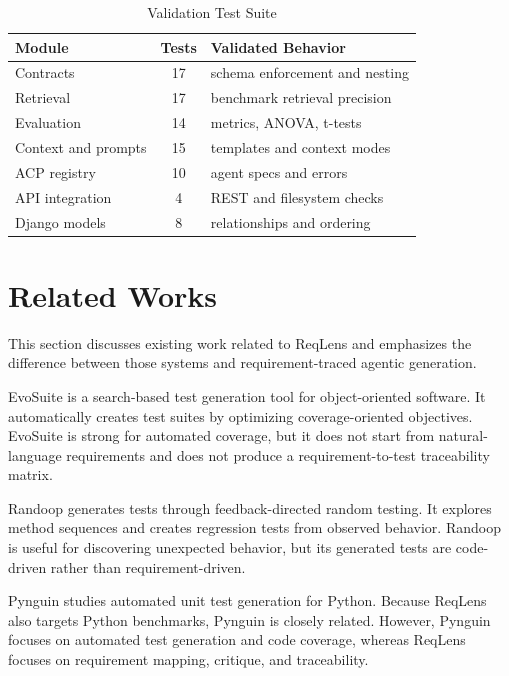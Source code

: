 \documentclass[conference]{IEEEtran}
\begin{document}
\begin{table}[htbp]
\caption{Validation Test Suite}
\begin{center}
\begin{tabular}{|p{}|c|p{}|}
\hline
\textbf{Module} & \textbf{Tests} & \textbf{Validated Behavior} \\
\hline
Contracts & 17 & schema enforcement and nesting \\
\hline
Retrieval & 17 & benchmark retrieval precision \\
\hline
Evaluation & 14 & metrics, ANOVA, t-tests \\
\hline
Context and prompts & 15 & templates and context modes \\
\hline
ACP registry & 10 & agent specs and errors \\
\hline
API integration & 4 & REST and filesystem checks \\
\hline
Django models & 8 & relationships and ordering \\
\hline
\end{tabular}
\label{tab:tests}
\end{center}
\end{table}

\section{Related Works}
This section discusses existing work related to ReqLens and emphasizes the
difference between those systems and requirement-traced agentic generation.

EvoSuite \cite{evosuite} is a search-based test generation tool for
object-oriented software. It automatically creates test suites by optimizing
coverage-oriented objectives. EvoSuite is strong for automated coverage, but it
does not start from natural-language requirements and does not produce a
requirement-to-test traceability matrix.

Randoop \cite{randoop} generates tests through feedback-directed random
testing. It explores method sequences and creates regression tests from
observed behavior. Randoop is useful for discovering unexpected behavior, but
its generated tests are code-driven rather than requirement-driven.

Pynguin \cite{pynguin} studies automated unit test generation for Python.
Because ReqLens also targets Python benchmarks, Pynguin is closely related.
However, Pynguin focuses on automated test generation and code coverage,
whereas ReqLens focuses on requirement mapping, critique, and traceability.
\end{document}
